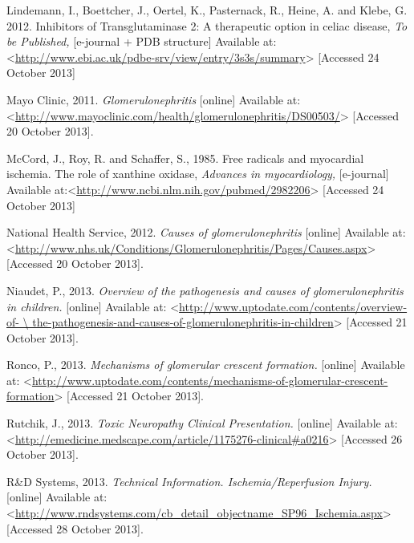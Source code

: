 \documentclass[12pt]{report}
\begin{document}
Lindemann, I., Boettcher, J., Oertel, K., Pasternack, R., Heine, A. and Klebe, G. 2012. Inhibitors of Transglutaminase 2: A therapeutic option in celiac disease, \textit{To be Published,} [e-journal + PDB structure] Available at:<\url{http://www.ebi.ac.uk/pdbe-srv/view/entry/3s3s/summary}> [Accessed 24 October 2013]
\newline
\newline

Mayo Clinic, 2011. \textit{Glomerulonephritis} [online] Available at: <\url{http://www.mayoclinic.com/health/glomerulonephritis/DS00503/}> [Accessed 20 October 2013].
\newline
\newline

McCord, J., Roy, R. and Schaffer, S., 1985. Free radicals and myocardial ischemia. The role of xanthine oxidase, \textit{Advances in myocardiology,} [e-journal] Available at:<\url{http://www.ncbi.nlm.nih.gov/pubmed/2982206}> [Accessed 24 October 2013]
\newline
\newline

National Health Service, 2012. \textit{Causes of glomerulonephritis} [online] Available at: <\url{http://www.nhs.uk/Conditions/Glomerulonephritis/Pages/Causes.aspx}> [Accessed 20 October 2013].
\newline
\newline

Niaudet, P., 2013. \textit{Overview of the pathogenesis and causes of glomerulonephritis in children.} [online] Available at: <\url{http://www.uptodate.com/contents/overview-of- \ the-pathogenesis-and-causes-of-glomerulonephritis-in-children}> [Accessed 21 October 2013].
\newline
\newline

Ronco, P., 2013. \textit{Mechanisms of glomerular crescent formation.} [online] Available at: <\url{http://www.uptodate.com/contents/mechanisms-of-glomerular-crescent-formation}> [Accessed 21 October 2013].
\newline
\newline

Rutchik, J., 2013. \textit{Toxic Neuropathy Clinical Presentation.} [online] Available at: <\url{http://emedicine.medscape.com/article/1175276-clinical#a0216}> [Accessed 26 October 2013].
\newline
\newline

R\&D Systems, 2013. \textit{Technical Information. Ischemia/Reperfusion Injury.} [online] Available at: <\url{http://www.rndsystems.com/cb_detail_objectname_SP96_Ischemia.aspx}> [Accessed 28 October 2013].
\newline
\newline
\end{document}
